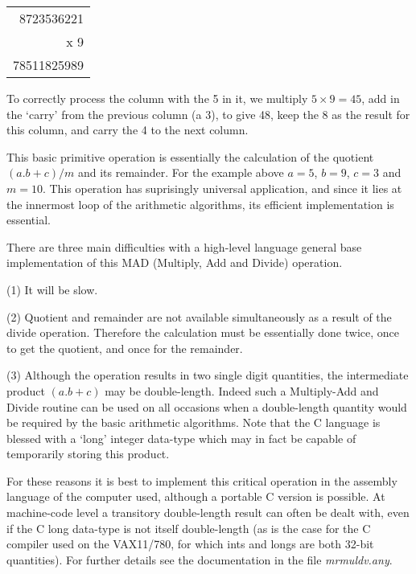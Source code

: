       \begin{center}
      \begin{tabular}{r}
          8723536221   \\
          x        9   \\ \hline
         78511825989   \\
      \end{tabular}
      \end{center}
                                

      To correctly process the column with  the  5  in  it,  we  multiply 
      $5\times9=45$,  add  in  the `carry' from the previous column (a 3),  to 
      give 48,  keep the 8 as the result for this column,  and carry  the 
      4 to the next column.  

      This  basic primitive operation is essentially the calculation of the 
      quotient $(a.b+c)/m$ and its remainder. For the example above $a=5$, 
      $b=9$, 
      $c=3$ and $m=10$.  This operation has suprisingly universal  application, 
      and since it lies at the innermost loop of the arithmetic algorithms, 
      its efficient implementation is essential.  

      There  are three main difficulties with a high-level language general 
      base implementation of this MAD (Multiply, Add and Divide) operation.  

\vspace{5mm}
      (1)  It will be slow.

\vspace{5mm}
      (2)  Quotient  and  remainder  are  not available simultaneously as a 
           result of the divide operation.  Therefore the calculation  must 
           be  essentially done twice,  once to get the quotient,  and once 
           for the remainder.  

\vspace{5mm}
       (3) Although the operation results in two single  digit  quantities, 
           the  intermediate  product $(a.b+c)$ may be double-length.  Indeed 
           such a Multiply-Add and  Divide  routine  can  be  used  on  all 
           occasions when a double-length quantity would be required by the 
           basic  arithmetic  algorithms.  Note  that  the  C language is 
           blessed with a `long' integer data-type which  may  in  fact  be 
           capable of temporarily storing this product.  

\vspace{5mm}
      For  these reasons it is best to implement this critical operation in 
      the assembly language of the computer used,  although a portable  C 
      version is possible. At machine-code level a transitory double-length 
      result can often be dealt with, even if the C long data-type is not 
      itself double-length (as is the case for the C compiler used on the 
      VAX11/780, for which ints and longs are both 32-bit quantities).  For 
      further details see the documentation in the file {\em mrmuldv.any}.  

